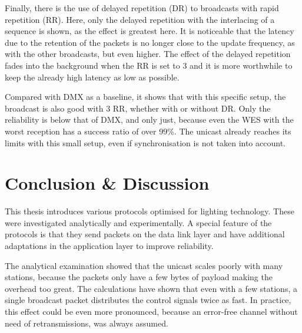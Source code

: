 Finally, there is the use of delayed repetition (DR) to broadcasts with rapid repetition (RR).
Here, only the delayed repetition with the interlacing of a sequence is shown,
as the effect is greatest here.
It is noticeable that the latency due to the retention of the packets is no longer close to the update frequency, 
as with the other broadcasts, but even higher.
The effect of the delayed repetition fades into the background when the RR is set to 3
and it is more worthwhile to keep the already high latency as low as possible.

Compared with DMX as a baseline, it shows that with this specific setup,
the broadcast is also good with 3 RR, whether with or without DR.
Only the reliability is below that of DMX, and only just,
because even the WES with the worst reception has a success ratio of over 99\%.
The unicast already reaches its limits with this small setup,
even if synchronisation is not taken into account.

\chapter{Conclusion \& Discussion}

This thesis introduces various protocols optimised for lighting technology.
These were investigated analytically and experimentally.
A special feature of the protocols is that they send packets on the data link layer
and have additional adaptations in the application layer to improve reliability.

The analytical examination showed that the unicast
scales poorly with many stations,
because the packets only have a few bytes of payload making the overhead too great.
The calculations have shown that even with a few stations, a single broadcast packet
distributes the control signals twice as fast.
In practice, this effect could be even more pronounced,
because an error-free channel without need of retransmissions, was always assumed.


